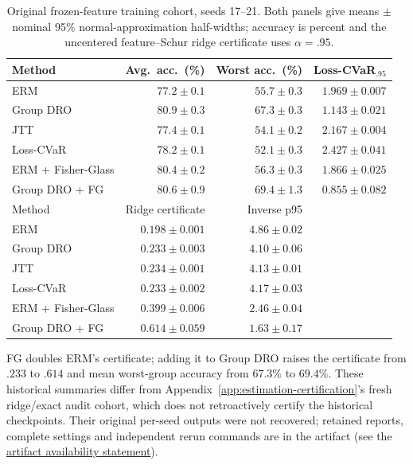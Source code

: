 \begin{table}[htbp]
\centering\small
\caption{Original frozen-feature training cohort, seeds 17--21. Both panels give means $\pm$ nominal 95\% normal-approximation half-widths; accuracy is percent and the uncentered feature--Schur ridge certificate uses $\alpha=.95$.}
\label{tab:e-frozen-performance}\label{tab:e-frozen-information}
\begin{tabular}{@{}lrrr@{}}
\toprule
Method & Avg.\ acc.\ (\%) & Worst acc.\ (\%) & Loss-CVaR$_{.95}$\\
\midrule
ERM & $77.2\pm0.1$ & $55.7\pm0.3$ & $1.969\pm0.007$\\
Group DRO & $80.9\pm0.3$ & $67.3\pm0.3$ & $1.143\pm0.021$\\
JTT & $77.4\pm0.1$ & $54.1\pm0.2$ & $2.167\pm0.004$\\
Loss-CVaR & $78.2\pm0.1$ & $52.1\pm0.3$ & $2.427\pm0.041$\\
ERM + Fisher-Glass & $80.4\pm0.2$ & $56.3\pm0.3$ & $1.866\pm0.025$\\
Group DRO + FG & $80.6\pm0.9$ & $69.4\pm1.3$ & $0.855\pm0.082$\\
\midrule
Method & Ridge certificate & Inverse p95 & \\
\midrule
ERM & $0.198\pm0.001$ & $4.86\pm0.02$ & \\
Group DRO & $0.233\pm0.003$ & $4.10\pm0.06$ & \\
JTT & $0.234\pm0.001$ & $4.13\pm0.01$ & \\
Loss-CVaR & $0.233\pm0.002$ & $4.17\pm0.03$ & \\
ERM + Fisher-Glass & $0.399\pm0.006$ & $2.46\pm0.04$ & \\
Group DRO + FG & $0.614\pm0.059$ & $1.63\pm0.17$ & \\
\bottomrule
\end{tabular}
\end{table}

FG doubles ERM's certificate; adding it to Group DRO raises the certificate from $.233$ to $.614$ and mean worst-group accuracy from $67.3\%$ to $69.4\%$. These historical summaries differ from Appendix~\ref{app:estimation-certification}'s fresh ridge/exact audit cohort, which does not retroactively certify the historical checkpoints. Their original per-seed outputs were not recovered; retained reports, complete settings and independent rerun commands are in the artifact (see the \hyperref[sec:artifact-availability]{artifact availability statement}).
